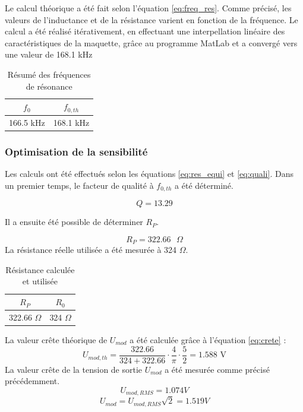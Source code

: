 Le calcul théorique a été fait selon l'équation \ref{eq:freq_res}.
Comme précisé, les valeurs de l'inductance et de la résistance varient en fonction de la fréquence.
Le calcul a été réalisé itérativement, en effectuant une interpellation linéaire des caractéristiques
de la maquette, grâce au programme MatLab et a convergé vers une valeur de 168.1 kHz 

\begin{table}[H]
    \centering
    \begin{tabular}{|c|c|}
        \hline
    $f_0$    & $f_{0,th}$  \\ \hline
    166.5 kHz & 168.1 kHz \\ \hline
    \end{tabular}
    \caption{Résumé des fréquences de résonance}
    \label{tab:freq_res}
\end{table}

\subsubsection{Optimisation de la sensibilité}

Les calculs ont été effectués selon les équations \ref{eq:res_equi} et \ref{eq:quali}. Dans un premier
temps, le facteur de qualité à $f_{0,th}$ a été déterminé.

\begin{equation*}
    Q=13.29
\end{equation*}

Il a ensuite été possible de déterminer $R_P$.

\begin{equation*}
    R_P=322.66 \text{ }\Omega
\end{equation*}
La résistance réelle utilisée a été mesurée à 324 $\Omega$.
\vspace{0,2cm}

\begin{table}[H]
    \centering
    \begin{tabular}{|c|c|}
    \hline
    $R_P$     & $R_0$  \\ \hline
    322.66 $\Omega$ & 324 $\Omega$ \\ \hline
    \end{tabular}
    \caption{Résistance calculée et utilisée}
    \label{tab:Resi}
    \end{table}

La valeur crête théorique de $U_{mod}$ a été calculée grâce à l'équation \ref{eq:crete} :
\begin{equation*}
    U_{mod,th} = \frac{322.66}{324+322.66}\cdot\frac{4}{\pi}\cdot \frac{5}{2} = 1.588\text{ V}
\end{equation*} 
\vspace{0,2cm}
La valeur crête de la tension de sortie $U_{mod}$ a été mesurée comme précisé précédemment.
\begin{equation*}
    U_{mod,RMS} = 1.074{ V}
\end{equation*} 
\begin{equation*}
    U_{mod} = U_{mod,RMS}\sqrt{2} = 1.519{ V}
\end{equation*} 


